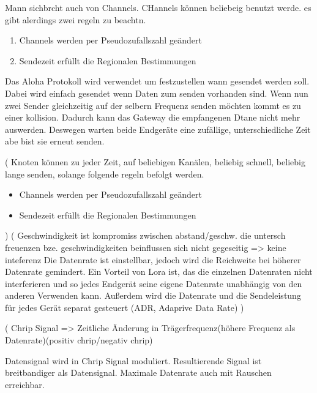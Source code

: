 \documentclass[a4paper,12pt]{article}
\begin{document}
            
            Mann sichbrcht auch von Channels. CHannels können beliebeig benutzt werde. es gibt alerdings zwei regeln zu beachtn. 
            \begin{enumerate}   
                \item Channels werden per Pseudozufallszahl geändert
                \item Sendezeit erfüllt die Regionalen Bestimmungen
            \end{enumerate}

            Das Aloha Protokoll wird verwendet um festzustellen wann gesendet werden soll. Dabei wird einfach gesendet wenn Daten zum senden vorhanden sind. Wenn nun zwei Sender gleichzeitig auf der selbern Frequenz senden möchten kommt es zu einer kollision. 
            Dadurch kann das Gateway die empfangenen Dtane nicht mehr auswerden. Deswegen warten beide Endgeräte eine zufällige, unterschiedliche Zeit abe bist sie erneut senden.

            \cite{LoRaSpec}(
                Knoten können zu jeder Zeit, auf beliebigen Kanälen, beliebig schnell, beliebig lange senden, solange folgende regeln befolgt werden.
                \begin{itemize}
                    
                        \item Channels werden per Pseudozufallszahl geändert
                        \item Sendezeit erfüllt die Regionalen Bestimmungen
                    
                \end{itemize}
            )
            \cite{LoRaSpec}(
                Geschwindigkeit ist kompromiss zwischen abstand/geschw. die untersch freuenzen bze. geschwindigkeiten beinflussen sich nicht gegeseitig => keine inteferenz
                Die Datenrate ist einstellbar, jedoch wird die Reichweite bei höherer Datenrate gemindert. Ein Vorteil von Lora ist, das die einzelnen Datenraten nicht interferieren und so jedes Endgerät seine eigene Datenrate unabhängig von den anderen Verwenden kann.
                Außerdem wird die Datenrate und die Sendeleistung für jedes Gerät separat gesteuert (ADR, Adaprive Data Rate)
            )

            \cite{LoraLimit}(
                Chrip Signal => Zeitliche Änderung in Trägerfrequenz(höhere Frequenz als Datenrate)(positiv chrip/negativ chrip)

                Datensignal wird in Chrip Signal moduliert. Resultierende Signal ist breitbandiger als Datensignal. Maximale Datenrate auch mit Rauschen erreichbar.
\end{document}
